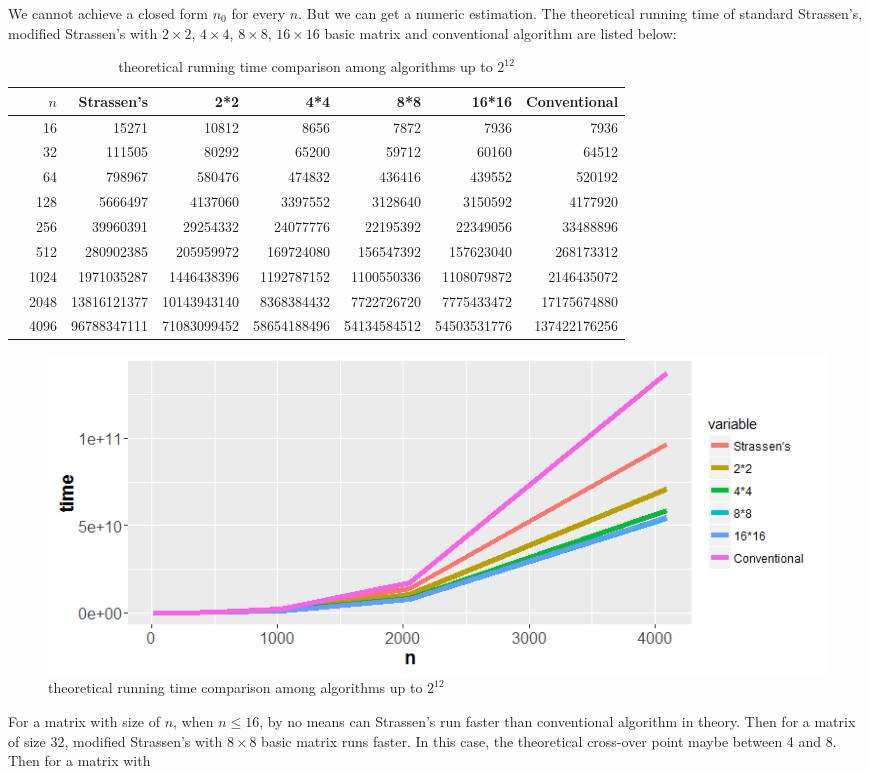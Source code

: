 \documentclass[a4paper, 11pt]{article}
\begin{document}
We cannot achieve a closed form $n_0$ for every $n$. But we can get a numeric estimation. The theoretical running time of standard Strassen's, modified Strassen's with $2\times2$, $4\times4$, $8 \times 8$, $16 \times 16$ basic matrix and conventional algorithm are listed below:
\begin{table}[ht]
	\centering
	\caption{theoretical running time comparison among algorithms up to $2^{12}$}
	\begin{tabular}{rrrrrrrr}
		\hline
		& $n$ & Strassen's & 2*2 & 4*4 & 8*8 & 16*16 & Conventional \\ 
		\hline
		& 16 & 15271 & 10812 & 8656 & 7872 & 7936 & 7936 \\ 
		& 32 & 111505 & 80292 & 65200 &\cellcolor{blue!25} 59712 & 60160 & 64512 \\ 
		& 64 & 798967 & 580476 &\cellcolor{blue!25} 474832 & 436416 & 439552 & 520192 \\ 
		& 128 & 5666497 &\cellcolor{blue!25} 4137060 & 3397552 & 3128640 & 3150592 & 4177920 \\ 
		& 256 & 39960391&  \cellcolor{blue!25}29254332 & 24077776 & 22195392 & 22349056 & 33488896 \\ 
		& 512 & 280902385 &\cellcolor{blue!25} 205959972 & 169724080 & 156547392 & 157623040 & 268173312 \\ 
		& 1024 &\cellcolor{blue!25} 1971035287 & 1446438396 & 1192787152 & 1100550336 & 1108079872 & 2146435072 \\ 
		& 2048 &\cellcolor{blue!25} 13816121377 & 10143943140 & 8368384432 & 7722726720 & 7775433472 & 17175674880 \\ 
		& 4096 &\cellcolor{blue!25} 96788347111 & 71083099452 & 58654188496 & 54134584512 & 54503531776 & 137422176256 \\ 
		\hline
	\end{tabular}
\end{table}
\begin{figure}[h]
	\centering
	\includegraphics[width=0.7\linewidth]{Numeric}
	\caption[]{theoretical running time comparison among algorithms up to $2^{12}$}
	\label{fig:numericto256}
\end{figure}
For a matrix with size of $n$, when $n\leq 16$, by no means can Strassen's run faster than conventional algorithm in theory. Then for a matrix of size 32, modified Strassen's with $8\times8$ basic matrix runs faster. In this case, the theoretical cross-over point maybe between 4 and 8. Then for a matrix with 
\end{document}
